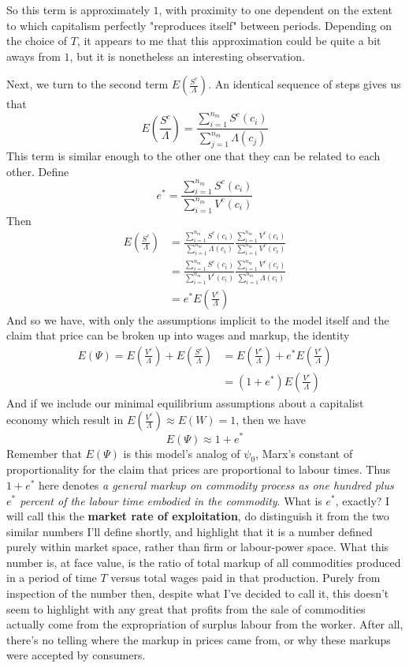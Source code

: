So this term is approximately $1$, with proximity to one dependent on the extent to which capitalism perfectly "reproduces itself" between periods. Depending on the choice of $T$, it appears to me that this approximation could be quite a bit aways from $1$, but it is nonetheless an interesting observation. \par 
Next, we turn to the second term $E\left(\frac{S^c}{\Lambda}\right)$. An identical sequence of steps gives us that
\[ E\left(\frac{S^c}{\Lambda}\right) = \frac{\sum_{i=1}^{n_m} S^c(c_i)}{\sum_{j=1}^{n_m} \Lambda(c_j)} \]
This term is similar enough to the other one that they can be related to each other. Define 
\[ e^* = \frac{\sum_{i=1}^{n_m} S^c(c_i)}{\sum_{i=1}^{n_m}V^c(c_i)} \]
Then 
\begin{align}
	E\left(\frac{S^c}{\Lambda} \right) &= \frac{\sum_{i=1}^{n_m} S^c(c_i)}{\sum_{i=1}^{n_m} \Lambda(c_i)}\frac{\sum_{i=1}^{n_m} V^c(c_i)}{\sum_{i=1}^{n_m} V^c(c_i)} \\
	&= \frac{\sum_{i=1}^{n_m} S^c(c_i)}{\sum_{i=1}^{n_m} V^c(c_i)}\frac{\sum_{i=1}^{n_m} V^c(c_i)}{\sum_{i=1}^{n_m} \Lambda(c_i)} \\
	&= e^*E\left( \frac{V^c}{\Lambda} \right)
\end{align} 
And so we have, with only the assumptions implicit to the model itself and the claim that price can be broken up into wages and markup, the identity
\begin{align}
	E(\Psi) =  E\left(\frac{V^c}{\Lambda}\right)+E\left(\frac{S^c}{\Lambda}\right) &= E \left( \frac{V^c}{\Lambda} \right) + e^* E \left( \frac{V^c}{\Lambda} \right) \\
	&= (1+e^*)E\left(\frac{V^c}{\Lambda}\right)
\end{align} 
And if we include our minimal equilibrium assumptions about a capitalist economy which result in $E\left(\frac{V^c}{\Lambda}\right) \approx E(W) = 1$, then we have
\[ E(\Psi) \approx 1+e^* \]
Remember that $E(\Psi)$ is this model's analog of $\psi_0$, Marx's constant of proportionality for the claim that prices are proportional to labour times. Thus $1+e^*$ here denotes \textit{a general markup on commodity process as one hundred plus $e^*$ percent of the labour time embodied in the commodity}. What is $e^*$, exactly? I will call this the \textbf{market rate of exploitation}, do distinguish it from the two similar numbers I'll define shortly, and highlight that it is a number defined purely within market space, rather than firm or labour-power space. What this number is, at face value, is the ratio of total markup of all commodities produced in a period of time $T$ versus total wages paid in that production. Purely from inspection of the number then, despite what I've decided to call it, this doesn't seem to highlight with any great that profits from the sale of commodities actually come from the expropriation of surplus labour from the worker. After all, there's no telling where the markup in prices came from, or why these markups were accepted by consumers. \par 
